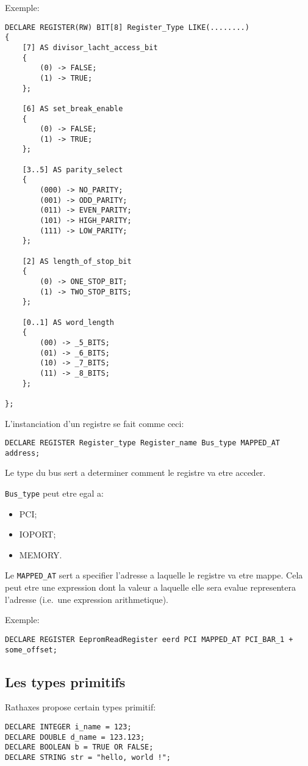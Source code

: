\documentclass{rtxreport}
\begin{document}
Exemple:
\begin{lstlisting}[caption=Exemple de description interne du registre]
DECLARE REGISTER(RW) BIT[8] Register_Type LIKE(........)
{
    [7] AS divisor_lacht_access_bit
    {
        (0) -> FALSE;
        (1) -> TRUE;
    };

    [6] AS set_break_enable
    {
        (0) -> FALSE;
        (1) -> TRUE;
    };

    [3..5] AS parity_select
    {
        (000) -> NO_PARITY;
        (001) -> ODD_PARITY;
        (011) -> EVEN_PARITY;
        (101) -> HIGH_PARITY;
        (111) -> LOW_PARITY;
    };

    [2] AS length_of_stop_bit
    {
        (0) -> ONE_STOP_BIT;
        (1) -> TWO_STOP_BITS;
    };

    [0..1] AS word_length
    {
        (00) -> _5_BITS;
        (01) -> _6_BITS;
        (10) -> _7_BITS;
        (11) -> _8_BITS;
    };

};
\end{lstlisting}


L'instanciation d'un registre se fait comme ceci:
\begin{lstlisting}[caption=Instanciation d'un registre]
DECLARE REGISTER Register_type Register_name Bus_type MAPPED_AT address;
\end{lstlisting}

Le type du bus sert a determiner comment le registre va etre acceder.

\texttt{Bus\_type} peut etre egal a:
\begin{itemize}
	\item PCI;
	\item IOPORT;
	\item MEMORY.
\end{itemize}

Le \texttt{MAPPED\_AT} sert a specifier l'adresse a laquelle le registre va etre mappe.
Cela peut etre une expression dont la valeur a laquelle elle sera evalue representera l'adresse (i.e.\ une expression
arithmetique).

Exemple:
\begin{lstlisting}[caption=Exemple d'instanciation de registre]
DECLARE REGISTER EepromReadRegister eerd PCI MAPPED_AT PCI_BAR_1 + some_offset;
\end{lstlisting}

\subsection{Les types primitifs}
Rathaxes propose certain types primitif:
\begin{lstlisting}[caption=Les types primitifs]
DECLARE INTEGER i_name = 123;
DECLARE DOUBLE d_name = 123.123;
DECLARE BOOLEAN b = TRUE OR FALSE;
DECLARE STRING str = "hello, world !";
\end{lstlisting}
\end{document}
